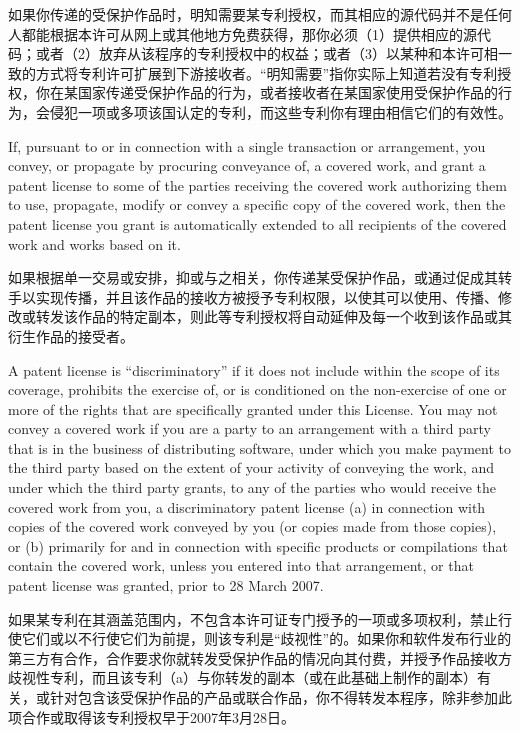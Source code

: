 \documentclass[11pt]{article}
\begin{document}
\begin{enumerate}
如果你传递的受保护作品时，明知需要某专利授权，而其相应的源代码并不是任何人都能根据本许可从网上或其他地方免费获得，那你必须（1）提供相应的源代码；或者（2）放弃从该程序的专利授权中的权益；或者（3）以某种和本许可相一致的方式将专利许可扩展到下游接收者。“明知需要”指你实际上知道若没有专利授权，你在某国家传递受保护作品的行为，或者接收者在某国家使用受保护作品的行为，会侵犯一项或多项该国认定的专利，而这些专利你有理由相信它们的有效性。

If, pursuant to or in connection with a single transaction or
arrangement, you convey, or propagate by procuring conveyance of, a
covered work, and grant a patent license to some of the parties
receiving the covered work authorizing them to use, propagate, modify
or convey a specific copy of the covered work, then the patent license
you grant is automatically extended to all recipients of the covered
work and works based on it.

如果根据单一交易或安排，抑或与之相关，你传递某受保护作品，或通过促成其转手以实现传播，并且该作品的接收方被授予专利权限，以使其可以使用、传播、修改或转发该作品的特定副本，则此等专利授权将自动延伸及每一个收到该作品或其衍生作品的接受者。

A patent license is ``discriminatory'' if it does not include within
the scope of its coverage, prohibits the exercise of, or is
conditioned on the non-exercise of one or more of the rights that are
specifically granted under this License.  You may not convey a covered
work if you are a party to an arrangement with a third party that is
in the business of distributing software, under which you make payment
to the third party based on the extent of your activity of conveying
the work, and under which the third party grants, to any of the
parties who would receive the covered work from you, a discriminatory
patent license (a) in connection with copies of the covered work
conveyed by you (or copies made from those copies), or (b) primarily
for and in connection with specific products or compilations that
contain the covered work, unless you entered into that arrangement,
or that patent license was granted, prior to 28 March 2007.

如果某专利在其涵盖范围内，不包含本许可证专门授予的一项或多项权利，禁止行使它们或以不行使它们为前提，则该专利是“歧视性”的。如果你和软件发布行业的第三方有合作，合作要求你就转发受保护作品的情况向其付费，并授予作品接收方歧视性专利，而且该专利（a）与你转发的副本（或在此基础上制作的副本）有关，或针对包含该受保护作品的产品或联合作品，你不得转发本程序，除非参加此项合作或取得该专利授权早于2007年3月28日。


\end{enumerate}
\end{document}
